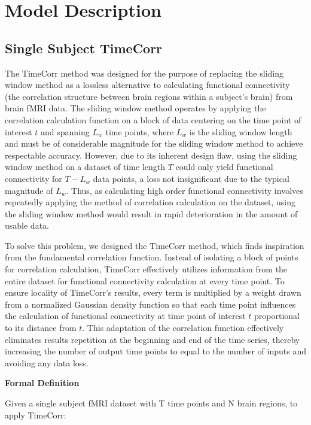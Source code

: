\documentclass[12pt]{article}
\begin{document}
\section{Model Description}
\subsection{Single Subject TimeCorr}
The TimeCorr method was designed for the purpose of replacing the sliding window method as a lossless alternative to calculating functional connectivity (the correlation structure between brain regions within a subject's brain) from brain fMRI data. The sliding window method operates by applying the correlation calculation function on a block of data centering on the time point of interest $t$ and spanning $L_w$ time points, where $L_w$ is the sliding window length and must be of considerable magnitude for the sliding window method to achieve respectable accuracy. However, due to its inherent design flaw, using the sliding window method on a dataset of time length $T$ could only yield functional connectivity for $T-L_w$ data points, a loss not insignificant due to the typical magnitude of $L_w$. Thus, as calculating high order functional connectivity involves repeatedly applying the method of correlation calculation on the dataset, using the sliding window method would result in rapid deterioration in the amount of usable data.

To solve this problem, we designed the TimeCorr method, which finds inspiration from the fundamental correlation function. Instead of isolating a block of points for correlation calculation, TimeCorr effectively utilizes information from the entire dataset for functional connectivity calculation at every time point. To ensure locality of TimeCorr's results, every term is multiplied by a weight drawn from a normalized Gaussian density function so that each time point influences the calculation of functional connectivity at time point of interest $t$ proportional to its distance from $t$. This adaptation of the correlation function effectively eliminates results repetition at the beginning and end of the time series, thereby increasing the number of output time points to equal to the number of inputs and avoiding any data loss.

\large{\textbf{Formal Definition}}

\normalsize
Given a single subject fMRI dataset with T time points and N brain regions, to apply TimeCorr:
\end{document}
